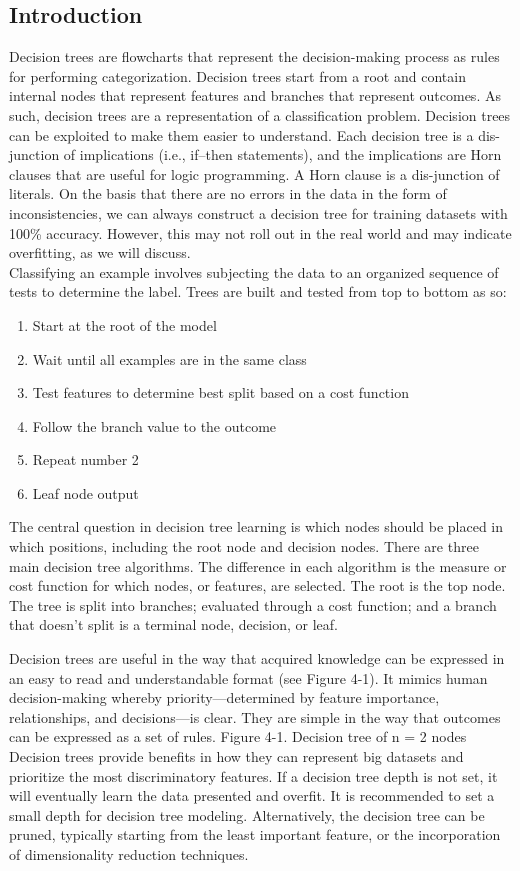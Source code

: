 \documentclass[12pt]{article}
\begin{document}
\subsection{Introduction}
Decision trees are flowcharts that represent the decision-making process as rules for performing categorization. Decision trees start from a root and contain internal nodes that represent features and branches that represent outcomes. As such, decision trees are a representation of a classification problem. Decision trees can be exploited to make them easier to understand. Each decision tree is a dis-junction of implications (i.e., if–then statements), and the implications are Horn clauses that are useful for logic
programming. A Horn clause is a dis-junction of literals.
On the basis that there are no errors in the data in the form of inconsistencies, we can always construct a decision tree for training datasets with 100\% accuracy. However, this may not roll out in the real world and may indicate overfitting, as we will discuss.
\\
Classifying an example involves subjecting the data to an organized sequence of tests to determine the label. Trees are built and tested from top to bottom as so:

\begin{enumerate}
\item Start at the root of the model
\item Wait until all examples are in the same class
\item Test features to determine best split based on a cost function
\item Follow the branch value to the outcome
\item Repeat number 2
\item Leaf node output
\end{enumerate}

The central question in decision tree learning is which nodes should be placed in which positions, including the root node and decision nodes. There are three main decision tree algorithms. The difference in each algorithm is the measure or cost function for which nodes, or features, are selected. The root is the top node. The tree is split into branches; evaluated through a cost function; and a branch that doesn’t split is a terminal node, decision, or leaf.

Decision trees are useful in the way that acquired knowledge can be expressed in an easy to read and understandable format (see Figure 4-1). It mimics human decision-making whereby priority—determined by feature importance, relationships, and decisions—is clear. They are simple in the way that outcomes can be expressed as a set of rules. Figure 4-1. Decision tree of n = 2 nodes
Decision trees provide benefits in how they can represent big datasets and prioritize the most discriminatory features. If a decision tree depth is not set, it will eventually learn the data presented and overfit. It is recommended to set a small depth for decision tree modeling. Alternatively, the decision tree can be pruned, typically starting from the least important feature, or the incorporation of dimensionality reduction techniques.
\end{document}
